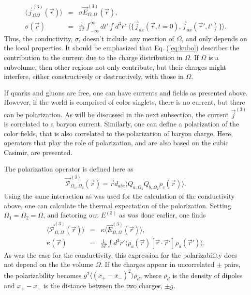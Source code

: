\documentclass[aps, prc, 12pt, nofootinbib, showpacs, superscriptaddress, tightenlines, groupedaddress]{revtex4-2}
\begin{document}
\begin{eqnarray}\label{eq:kubo}
\langle\vec{j}^{(3)}_{\Omega\Omega}(\vec{r})\rangle&=&\sigma \vec{E}^{(3)}_{\Omega,\Omega}(\vec{r}),\\
\nonumber
\sigma(\vec{r})&=&\frac{1}{2T}\int_{-\infty}^\infty dt'\int d^3r'~\langle\{\vec{j}_{ax}(\vec{r},t=0),\vec{j}_{ax}(\vec{r}',t')\}\rangle.
\end{eqnarray}
Thus, the conductivity, $\sigma$, doesn't include any mention of $\Omega$, and only depends on the local properties. It should be emphasized that Eq. (\ref{eq:kubo}) describes the contribution to the current due to the charge distribution in $\Omega$. If $\Omega$ is a subvolume, then other regions not only contribute, but their charges might interfere, either constructively or destructively, with those in $\Omega$.

If quarks and gluons are free, one can have currents and fields as presented above. However, if the world is comprised of color singlets, there is no current, but there can be polarization. As will be discussed in the next subsection, the current $\vec{j}^{(3)}$ is correlated to a baryon current. Similarly, one can define a polarization of the color fields, that is also correlated to the polarization of baryon charge. Here, operators that play the role of polarization, and are also based on the cubic Casimir, are presented. 

The polarization operator is defined here as
\begin{eqnarray}
\vec{\mathcal{P}}_{\Omega_1,\Omega_2}^{(3)}(\vec{r})=\vec{r}d_{abc}\langle Q_{a,\Omega_1}Q_{b,\Omega_2}\rho_c(\vec{r})\rangle.
\end{eqnarray}
Using the same interaction as was used for the calculation of the conductivity above, one can calculate the thermal expectation of the polarization. Setting $\Omega_1=\Omega_2=\Omega$, and factoring out $E^{(3)}$ as was done earlier, one finds
\begin{eqnarray}\label{eq:polarization}
\langle\vec{\mathcal{P}}_{\Omega,\Omega}^{(3)}(\vec{r})\rangle&=&\kappa \langle\vec{E}^{(3)}_{\Omega,\Omega}(\vec{r})\rangle,\\
\nonumber
\kappa(\vec{r})&=&\frac{1}{3T}\int d^3r'\langle \rho_a(\vec{r})[\vec{r}\cdot\vec{r}']\rho_a(\vec{r}')\rangle.
\end{eqnarray}
As was the case for the conductivity, this expression for the polarizability does not depend on the the volume $\Omega$. If the charges appear in uncorrelated $\pm$ pairs, the polarizability becomes $g^2\langle(x_+-x_-)^2\rangle\rho_d$, where $\rho_d$ is the density of dipoles and $x_+-x_-$ is the distance between the two charges, $\pm g$. 
\end{document}
